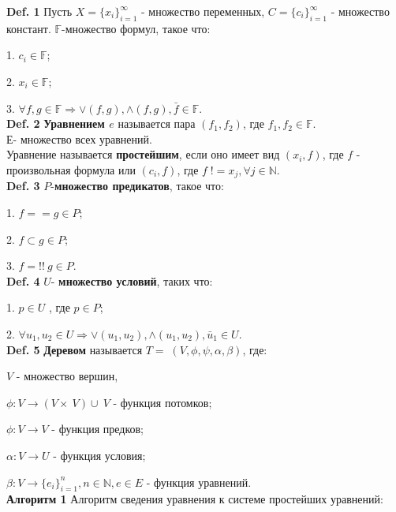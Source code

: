 \documentclass[12pt]{article}
\begin{document}
 
	{\bf Def. 1} Пусть $X = \lbrace  x_{i}  \rbrace_{i=1}^{\infty} $ - множество переменных,
	$C = \lbrace  c_{i}  \rbrace_{i=1}^{\infty} $ - множество констант. $\mathbb{F}$-множество формул, такое что:
	
	1. $c_{i} \in \mathbb{F} $; 
	
	2. $x_{i} \in \mathbb{F} $; 
	
	3. $\forall f, g \in \mathbb{F} \Rightarrow \vee(f,g), \wedge(f,g), \bar f \in \mathbb{F}$.
	\\

	{\bf Def. 2} {\bf Уравнением  $e$} называется пара $(f_{1},f_{2})$, где $f_{1},f_{2} \in \mathbb{F}$.\\Е- множество всех уравнений.
	\\Уравнение называется {\bf простейшим}, если оно имеет вид $(x_{i}, f)$, где $f$ - произвольная формула или $(c_{i}, f)$, где $f \; != x_{j}, \forall j \in \mathbb{N}$.
	\\
	
	{\bf Def. 3} $P$-{\bf множество предикатов}, такое что: 
	
	1. $f==g \in P$; 
	
    2. $f \subset g \in P$;
    
    3. $f =!! \: g \in P$.
    \\
    
    {\bf Def. 4}  $U$- {\bf множество условий}, таких что: 
    
    1. $p \in U$ , где $p \in P$;
    
    2. $\forall u_{1}, u_{2} \in U \Rightarrow \vee(u_{1},u_{2}), \wedge(u_{1},u_{2}), \bar u_{1} \in U$.
    \\
    
     {\bf Def. 5} {\bf Деревом} называется $T = \; (V,\phi,\psi, \alpha, \beta)$, где: 
     
     $V$ - множество вершин,
     
      $\phi : V \rightarrow (V\times \:V)\cup \:V$ - функция потомков;
      
      $\phi : V \rightarrow V$ - функция предков;
      
      $\alpha : V \rightarrow U$ - функция условия;
      
      $\beta : V \rightarrow \lbrace  e_{i}  \rbrace_{i=1}^{n}, n \in \mathbb{N}, e \in E $ - функция уравнений.
     \\
     
     \hypertarget{a1}{{\bf Алгоритм 1}}
     Алгоритм сведения уравнения к системе простейших уравнений:
     
\end{document}
